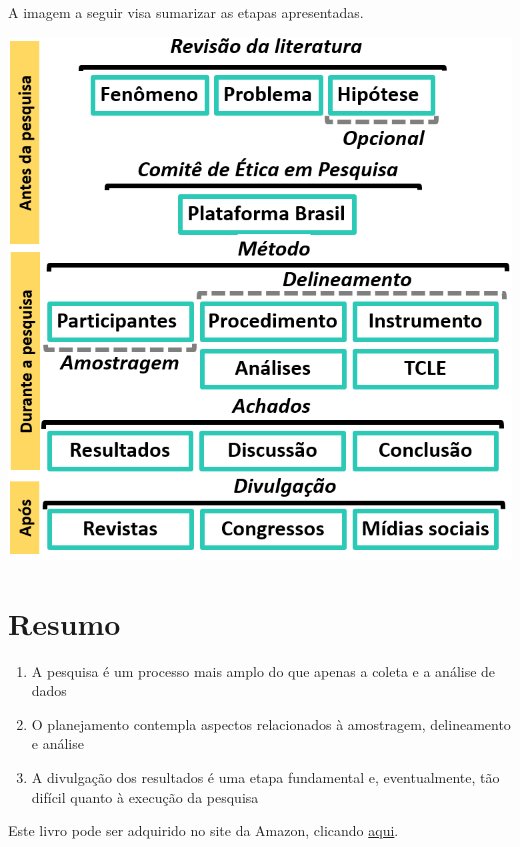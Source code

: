 \documentclass[
]{book}
\providecommand{\tightlist}{%
  \setlength{\itemsep}{0pt}\setlength{\parskip}{0pt}}
\begin{document}
A imagem a seguir visa sumarizar as etapas apresentadas.

\includegraphics{./img/cap_pesquisa_aplicada_fluxograma.png}

\hypertarget{resumo-5}{%
\section{Resumo}\label{resumo-5}}

\begin{enumerate}
\def\labelenumi{\arabic{enumi}.}
\tightlist
\item
  A pesquisa é um processo mais amplo do que apenas a coleta e a análise de dados\\
\item
  O planejamento contempla aspectos relacionados à amostragem, delineamento e análise\\
\item
  A divulgação dos resultados é uma etapa fundamental e, eventualmente, tão difícil quanto à execução da pesquisa\\
\end{enumerate}

Este livro pode ser adquirido no site da Amazon, clicando \href{https://www.amazon.com.br/gp/product/B097CP7T9M?pf_rd_r=RDZC8XYMBC1WY69T0J8K\&pf_rd_p=abb22e6b-8812-4b76-a424-5f0b098d2c90\&pd_rd_r=ceec1911-f409-4acd-ac8f-2d5bc68dac43\&pd_rd_w=wMUzJ\&pd_rd_wg=ZK85a\&ref_=pd_gw_unk}{aqui}.
\end{document}
